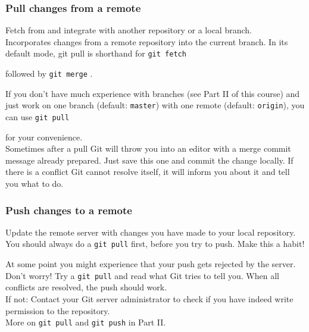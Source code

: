 \documentclass[handout,notes]{gittalk}
\newcommand{\hlcommand}[1]{ %
\colorbox{base3}{\small \texttt{#1}}
}
\begin{document}
\begin{frame}[fragile]
\frametitle{Pull changes from a remote}
\begin{tcolorbox}[title=git pull]
Fetch from and integrate with another repository or a local 
branch.\\[0.5em]
Incorporates changes from a remote repository into the current branch. 
In its default mode, git pull is shorthand for \hlcommand{git fetch} 
followed by \hlcommand{git merge}.
\end{tcolorbox}
\vspace*{0.5em}
If you don't have much experience with branches (see Part II of this 
course) and just work on one branch (default: \texttt{master}) with 
one remote (default: \texttt{origin}), you can use \hlcommand{git pull}
for your convenience.\\[0.5em]
Sometimes after a pull Git will throw you into an editor with a merge 
commit message already prepared. Just save this one and commit the 
change locally. If there is a conflict Git cannot resolve itself, it 
will inform you about it and tell you what to do.
\end{frame}

\begin{frame}[fragile]
\frametitle{Push changes to a remote}
\begin{tcolorbox}[title=git push]
Update the remote server with changes you have made to your local 
repository.\\[0.5em]
You should always do a  \hlcommand{git pull} first, before you try to 
push. Make this a habit!
\end{tcolorbox}

At some point you might experience that your push gets rejected by the 
server. Don't worry! Try a \hlcommand{git pull} and read what Git 
tries to tell you. When all conflicts are resolved, the push should 
work.\\[0.5em]
If not: Contact your Git server administrator to check if you have 
indeed write permission to the repository.\\[0.5em]
More on \hlcommand{git pull} and \hlcommand{git push} in Part II.

\end{frame}
\end{document}
